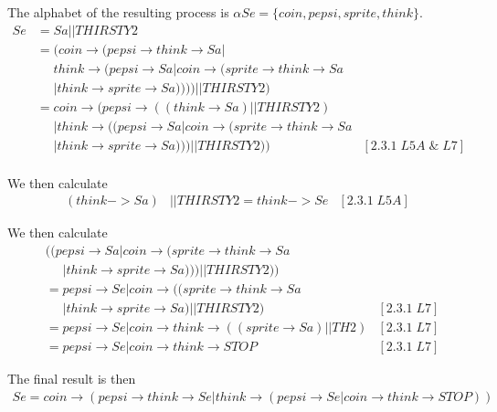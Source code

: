 \documentclass[a4paper, 11pt]{article}
\begin{document}
The alphabet of the resulting process is $\alpha Se = \{ coin, pepsi, sprite, think \}$.
\begin{align*}
Se &= Sa || THIRSTY2 \\
   &= (coin \rightarrow (pepsi \rightarrow think \rightarrow Sa | \\
   &\phantom{=} think \rightarrow (pepsi \rightarrow Sa | coin \rightarrow (sprite \rightarrow think \rightarrow Sa \\
   &\phantom{=} | think \rightarrow sprite \rightarrow Sa)))) || THIRSTY2) \\
   &= coin \rightarrow (pepsi \rightarrow ((think \rightarrow Sa) || THIRSTY2) \\
   &\phantom{=} | think \rightarrow ((pepsi \rightarrow Sa | coin \rightarrow (sprite \rightarrow think \rightarrow Sa \\
   &\phantom{=} | think \rightarrow sprite \rightarrow Sa))) || THIRSTY2)) & [2.3.1\;L5A\;\&\;L7] \\
\end{align*}

We then calculate
\begin{align*}
(think -> Sa) &|| THIRSTY2 = think -> Se & [2.3.1\;L5A]
\end{align*}

We then calculate 
\begin{align*}
& ((pepsi \rightarrow Sa | coin \rightarrow (sprite \rightarrow think \rightarrow Sa \\
&\phantom{=} | think \rightarrow sprite \rightarrow Sa))) || THIRSTY2)) \\
&= pepsi \rightarrow Se | coin \rightarrow ((sprite \rightarrow think \rightarrow Sa \\
&\phantom{=} | think \rightarrow sprite \rightarrow Sa) || THIRSTY2) & [2.3.1\;L7] \\
&= pepsi \rightarrow Se | coin \rightarrow think \rightarrow ((sprite \rightarrow Sa) || TH2) & [2.3.1\;L7] \\
&= pepsi \rightarrow Se | coin \rightarrow think \rightarrow STOP & [2.3.1\;L7]
\end{align*}

The final result is then
\begin{align*}
Se = coin \rightarrow (pepsi \rightarrow think \rightarrow Se | think \rightarrow (pepsi \rightarrow Se | coin \rightarrow think \rightarrow STOP))
\end{align*}

\end{document}
